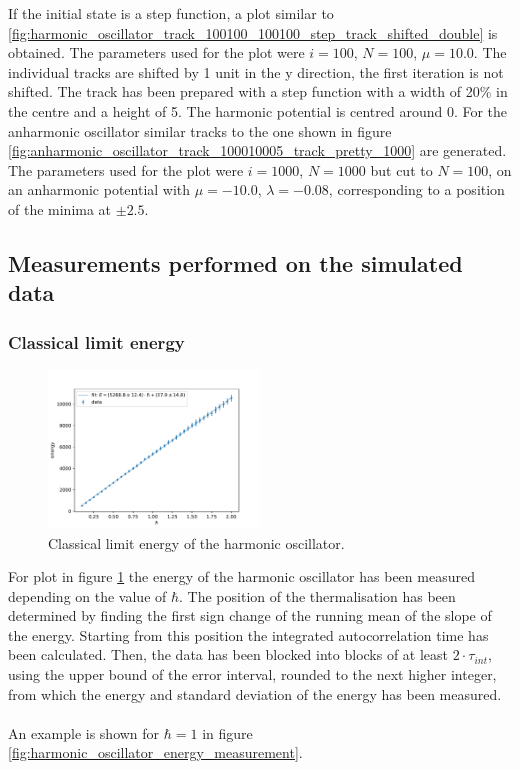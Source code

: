 \documentclass{scrartcl}
\begin{document}
		If the initial state is a step function, a plot similar to \ref{fig:harmonic_oscillator_track_100100_100100_step_track_shifted_double} is obtained.
		The parameters used for the plot were $i=100$, $N=100$, $\mu = 10.0$.
		The individual tracks are shifted by 1 unit in the y direction, the first iteration is not shifted.
		The track has been prepared with a step function with a width of 20\% in the centre and a height of 5.
		The harmonic potential is centred around 0.
		For the anharmonic oscillator similar tracks to the one shown in figure \ref{fig:anharmonic_oscillator_track_100010005_track_pretty_1000} are generated.
		The parameters used for the plot were $i=1000$, $N=1000$ but cut to $N=100$, on an anharmonic potential with $\mu = -10.0$, $\lambda = -0.08$, corresponding to a position of the minima at $\pm 2.5$.

	\subsection{Measurements performed on the simulated data}
	\label{sec:measurements}
	\subsubsection{Classical limit energy}
		\begin{figure}[H]
			\centering
				\includegraphics[width=0.5\textwidth]{../imgs/harmonic_oscillator_classical_limit_energy/harmonic_oscillator_10_classical_limit_energy.pdf}
			\caption{Classical limit energy of the harmonic oscillator.}
			\label{fig:harmonic_oscillator_classical_limit_energy}
		\end{figure}
		For plot in figure \ref{fig:harmonic_oscillator_classical_limit_energy} the energy of the harmonic oscillator has been measured depending on the value of $\hbar$.
		The position of the thermalisation has been determined by finding the first sign change of the running mean of the slope of the energy.
		Starting from this position the integrated autocorrelation time has been calculated.
		Then, the data has been blocked into blocks of at least $2 \cdot \tau_{int}$, using the upper bound of the error interval, rounded to the next higher integer, from which the energy and standard deviation of the energy has been measured.
		\\\\
		An example is shown for $\hbar = 1$ in figure \ref{fig:harmonic_oscillator_energy_measurement}.
\end{document}
